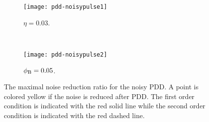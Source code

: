 \documentclass[pra,reprint,superscriptaddress]{revtex4-2}
\begin{document}
 \begin{figure}
 \centering
 \begin{subfigure}{0.8\linewidth}
\texttt{[image: pdd-noisypulse1]}
\caption{$\eta =0.03$.}
\label{fig:pdd-noisy-pulse1}
\end{subfigure}
\\
\begin{subfigure}{0.8\linewidth}
\texttt{[image: pdd-noisypulse2]}
\caption{$\phi_{\mathrm{B}} =0.05$.}
\label{fig:pdd-noisy-pulse2}
\end{subfigure}
\caption{The maximal noise reduction ratio for the noisy PDD. A point is colored yellow if the noise is reduced after PDD.  The first order condition is indicated with the red solid line while the second order condition is indicated with the red dashed line. }
\label{fig:pdd-noisy-pulse}
\end{figure}
\end{document}
